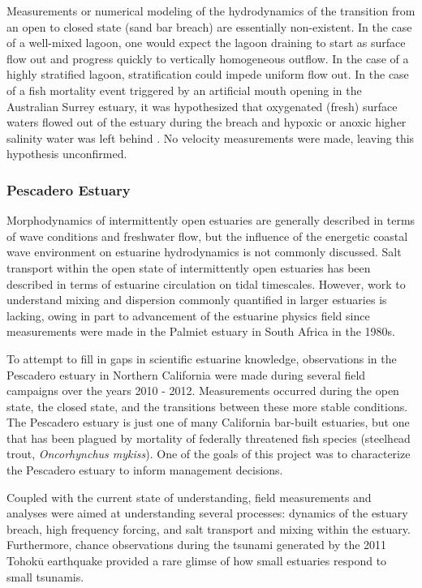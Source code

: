 Measurements or numerical modeling of the hydrodynamics of the transition from an open to closed state (sand bar breach) are essentially non-existent. In the case of a well-mixed lagoon, one would expect the lagoon draining to start as surface flow out and progress quickly to vertically homogeneous outflow.  In the case of a highly stratified lagoon, stratification could impede uniform flow out. In the case of a fish mortality event triggered by an artificial mouth opening in the Australian Surrey estuary, it was hypothesized that oxygenated (fresh) surface waters flowed out of the estuary during the breach and hypoxic or anoxic higher salinity water was left behind \parencite{becker_artificial_2009}. No velocity measurements were made, leaving this hypothesis unconfirmed.

\subsubsection{Pescadero Estuary} 
Morphodynamics of intermittently open estuaries are generally described in terms of wave conditions and freshwater flow, but the influence of the energetic coastal wave environment on estuarine hydrodynamics is not commonly discussed. Salt transport within the open state of intermittently open estuaries has been described in terms of estuarine circulation on tidal timescales. However, work to understand mixing and dispersion commonly quantified in larger estuaries is lacking, owing in part to advancement of the estuarine physics field since measurements were made in the Palmiet estuary in South Africa in the 1980s. 


To attempt to fill in gaps in scientific estuarine knowledge, observations in the Pescadero estuary in Northern California were made during several field campaigns over the years 2010 - 2012. Measurements occurred during the open state, the closed state, and the transitions between these more stable conditions. The Pescadero estuary is just one of many California bar-built estuaries, but one that has been plagued by mortality of federally threatened fish species (steelhead trout, \emph{Oncorhynchus mykiss}). One of the goals of this project was to characterize the Pescadero estuary to inform management decisions. 

Coupled with the current state of understanding, field measurements and analyses were aimed at understanding several processes: dynamics of the estuary breach, high frequency forcing, and salt transport and mixing within the estuary. Furthermore, chance observations during the tsunami generated by the 2011 Tohok$\overline{\mathrm{u}}$ earthquake provided a rare glimse of how small estuaries respond to small tsunamis. 


